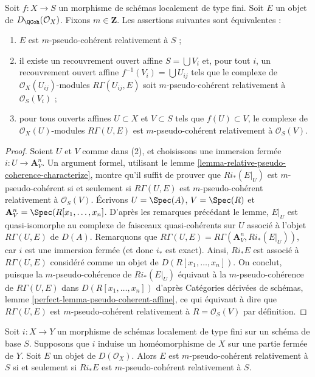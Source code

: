 \begin{lemma}
\label{lemma-qcoh-relative-pseudo-coherence-characterize}
Soit $f : X \to S$ un morphisme de schémas localement de type fini.
Soit $E$ un objet de $D_\QCoh(\mathcal{O}_X)$.
Fixons $m \in \mathbf{Z}$. Les assertions suivantes sont équivalentes :
\begin{enumerate}
\item $E$ est $m$-pseudo-cohérent relativement à $S$ ;
\item il existe un recouvrement ouvert affine $S = \bigcup V_i$ et,
pour tout $i$, un recouvrement ouvert affine $f^{-1}(V_i) = \bigcup U_{ij}$
tels que le complexe de $\mathcal{O}_X(U_{ij})$-modules
$R\Gamma(U_{ij}, E)$ soit $m$-pseudo-cohérent relativement à
$\mathcal{O}_S(V_i)$ ;
\item pour tous ouverts affines $U \subset X$ et $V \subset S$
tels que $f(U) \subset V$, le complexe de $\mathcal{O}_X(U)$-modules
$R\Gamma(U, E)$ est $m$-pseudo-cohérent relativement à $\mathcal{O}_S(V)$.
\end{enumerate}
\end{lemma}

\begin{proof}
Soient $U$ et $V$ comme dans (2), et choisissons une immersion fermée
$i : U \to \mathbf{A}^n_V$. Un argument formel, utilisant le
lemme \ref{lemma-relative-pseudo-coherence-characterize}, montre qu'il
suffit de prouver que
$Ri_*(E|_U)$ est $m$-pseudo-cohérent si et seulement si $R\Gamma(U, E)$
est $m$-pseudo-cohérent relativement à $\mathcal{O}_S(V)$.
Écrivons $U = \Spec(A)$, $V = \Spec(R)$ et
$\mathbf{A}^n_V = \Spec(R[x_1, \ldots, x_n]$. D'après les remarques
précédant le lemme, $E|_U$ est quasi-isomorphe au
complexe de faisceaux quasi-cohérents sur $U$ associé à l'objet
$R\Gamma(U, E)$ de $D(A)$. Remarquons que
$R\Gamma(U, E) = R\Gamma(\mathbf{A}^n_V, Ri_*(E|_U))$, car $i$ est une
immersion fermée (et donc $i_*$ est exact). Ainsi, $Ri_*E$
est associé à $R\Gamma(U, E)$ considéré comme un objet de
$D(R[x_1, \ldots, x_n])$. On conclut, puisque la $m$-pseudo-cohérence
de $Ri_*(E|_U)$ équivaut à la $m$-pseudo-cohérence de
$R\Gamma(U, E)$ dans $D(R[x_1, \ldots, x_n])$ d'après
Catégories dérivées de schémas, lemme \ref{perfect-lemma-pseudo-coherent-affine},
ce qui équivaut à dire que $R\Gamma(U, E)$ est $m$-pseudo-cohérent
relativement à $R = \mathcal{O}_S(V)$ par définition.
\end{proof}

\begin{lemma}
\label{lemma-closed-morphism-relative-pseudo-coherence}
Soit $i : X \to Y$ un morphisme de schémas localement de type fini sur un
schéma de base $S$. Supposons que $i$ induise un homéomorphisme de $X$ sur une partie
fermée de $Y$. Soit $E$ un objet de $D(\mathcal{O}_X)$.
Alors $E$ est $m$-pseudo-cohérent relativement à $S$ si et seulement si
$Ri_*E$ est $m$-pseudo-cohérent relativement à $S$.
\end{lemma}

